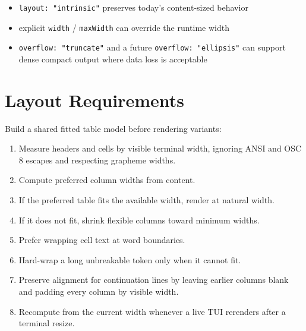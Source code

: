 \begin{itemize}
\tightlist
\item
  \texttt{l\allowbreak{}a\allowbreak{}y\allowbreak{}o\allowbreak{}u\allowbreak{}t\allowbreak{}:\allowbreak{} \allowbreak{}"\allowbreak{}i\allowbreak{}n\allowbreak{}t\allowbreak{}r\allowbreak{}i\allowbreak{}n\allowbreak{}s\allowbreak{}i\allowbreak{}c\allowbreak{}"} preserves today's content-sized behavior
\item
  explicit \texttt{w\allowbreak{}i\allowbreak{}d\allowbreak{}t\allowbreak{}h} / \texttt{m\allowbreak{}a\allowbreak{}x\allowbreak{}W\allowbreak{}i\allowbreak{}d\allowbreak{}t\allowbreak{}h} can override the runtime width
\item
  \texttt{o\allowbreak{}v\allowbreak{}e\allowbreak{}r\allowbreak{}f\allowbreak{}l\allowbreak{}o\allowbreak{}w\allowbreak{}:\allowbreak{} \allowbreak{}"\allowbreak{}t\allowbreak{}r\allowbreak{}u\allowbreak{}n\allowbreak{}c\allowbreak{}a\allowbreak{}t\allowbreak{}e\allowbreak{}"} and a future \texttt{o\allowbreak{}v\allowbreak{}e\allowbreak{}r\allowbreak{}f\allowbreak{}l\allowbreak{}o\allowbreak{}w\allowbreak{}:\allowbreak{} \allowbreak{}"\allowbreak{}e\allowbreak{}l\allowbreak{}l\allowbreak{}i\allowbreak{}p\allowbreak{}s\allowbreak{}i\allowbreak{}s\allowbreak{}"} can support dense compact output where data loss is acceptable
\end{itemize}

\section{Layout Requirements}\label{record-133-layout-requirements}

Build a shared fitted table model before rendering variants:

\begin{enumerate}
\def\labelenumi{\arabic{enumi}.}
\tightlist
\item
  Measure headers and cells by visible terminal width, ignoring ANSI and OSC 8 escapes and respecting grapheme widths.
\item
  Compute preferred column widths from content.
\item
  If the preferred table fits the available width, render at natural width.
\item
  If it does not fit, shrink flexible columns toward minimum widths.
\item
  Prefer wrapping cell text at word boundaries.
\item
  Hard-wrap a long unbreakable token only when it cannot fit.
\item
  Preserve alignment for continuation lines by leaving earlier columns blank and padding every column by visible width.
\item
  Recompute from the current width whenever a live TUI rerenders after a terminal resize.
\end{enumerate}


